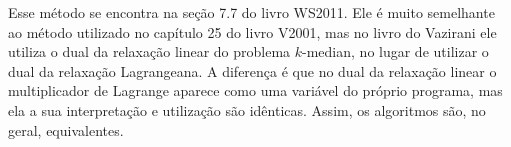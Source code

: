 
Esse método se encontra na seção 7.7 do livro WS2011. Ele é muito semelhante ao método utilizado no capítulo 25 do livro V2001, mas no livro do Vazirani ele utiliza o dual da relaxação linear do problema $k$-median, no lugar de utilizar o dual da relaxação Lagrangeana. A diferença é que no dual da relaxação linear o multiplicador de Lagrange aparece como uma variável do próprio programa, mas ela a sua interpretação e utilização são idênticas. Assim, os algoritmos são, no geral, equivalentes.